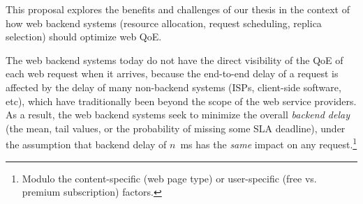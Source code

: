 This proposal explores the benefits and challenges of our thesis in the context of how web backend systems (\eg resource allocation, request scheduling, replica selection) should optimize web QoE. 

The web backend systems today do not have the direct visibility of the QoE of each web request when it arrives, because the end-to-end delay of a request is affected by the delay of many non-backend systems (ISPs, client-side software, etc), which have traditionally been beyond the scope of the web service providers.
As a result, the web backend systems seek to minimize the overall {\em backend delay} (\eg the mean, tail values, or the probability of missing some SLA deadline), under the assumption that backend delay of $n$~ms has the {\em same} impact on any request.\footnote{Modulo the content-specific (\eg web page type) or user-specific (\eg free vs. premium subscription) factors.}

